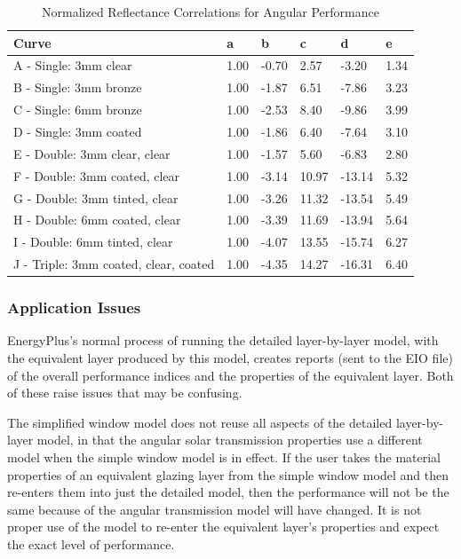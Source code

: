 \begin{table}[tbp]
  \caption{Normalized Reflectance Correlations for Angular Performance}
  \label{tab:normalized-reflectance-correlations-for}
  \centering
  \begin{tabular}{llllll}
  \hline
  Curve                                 & a    & b     & c     & d      & e    \\ \hline
  A - Single: 3mm clear                 & 1.00 & -0.70 & 2.57  & -3.20  & 1.34 \\
  B - Single: 3mm bronze                & 1.00 & -1.87 & 6.51  & -7.86  & 3.23 \\
  C - Single: 6mm bronze                & 1.00 & -2.53 & 8.40  & -9.86  & 3.99 \\
  D - Single: 3mm coated                & 1.00 & -1.86 & 6.40  & -7.64  & 3.10 \\
  E - Double: 3mm clear, clear          & 1.00 & -1.57 & 5.60  & -6.83  & 2.80 \\
  F - Double: 3mm coated, clear         & 1.00 & -3.14 & 10.97 & -13.14 & 5.32 \\
  G - Double: 3mm tinted, clear         & 1.00 & -3.26 & 11.32 & -13.54 & 5.49 \\
  H - Double: 6mm coated, clear         & 1.00 & -3.39 & 11.69 & -13.94 & 5.64 \\
  I - Double: 6mm tinted, clear         & 1.00 & -4.07 & 13.55 & -15.74 & 6.27 \\
  J - Triple: 3mm coated, clear, coated & 1.00 & -4.35 & 14.27 & -16.31 & 6.40 \\ \hline
  \end{tabular}
\end{table}

\subsubsection{Application Issues}\label{application-issues}

EnergyPlus's normal process of running the detailed layer-by-layer model, with the equivalent layer produced by this model, creates reports (sent to the EIO file) of the overall performance indices and the properties of the equivalent layer. Both of these raise issues that may be confusing.

The simplified window model does not reuse all aspects of the detailed layer-by-layer model, in that the angular solar transmission properties use a different model when the simple window model is in effect. If the user takes the material properties of an equivalent glazing layer from the simple window model and then re-enters them into just the detailed model, then the performance will not be the same because of the angular transmission model will have changed. It is not proper use of the model to re-enter the equivalent layer's properties and expect the exact level of performance.

